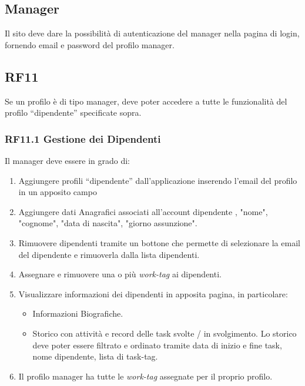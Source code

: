 \documentclass{report}
\begin{document}
\subsection{Manager}
Il sito deve dare la possibilità di autenticazione del manager nella pagina di login, fornendo email e password del profilo manager.

\subsection*{RF11}
Se un profilo è di tipo manager, deve poter accedere a tutte le funzionalità del profilo “dipendente” specificate sopra.

\subsubsection*{RF11.1 Gestione dei Dipendenti}
Il manager deve essere in grado di:

\begin{enumerate}
	
	\item Aggiungere profili “dipendente” dall’applicazione inserendo l’email del profilo in un apposito campo
	\item Aggiungere dati Anagrafici associati all'account dipendente , "nome", "cognome", "data di nascita", "giorno assunzione".
	\item Rimuovere dipendenti tramite un bottone che permette di selezionare la 
	email del dipendente e rimuoverla dalla lista dipendenti.
	
	\item Assegnare e rimuovere una o più \textit{work-tag} ai dipendenti. 
	
	\item Visualizzare informazioni dei dipendenti in apposita pagina, in particolare:
	
	\begin{itemize}
		\item Informazioni Biografiche.
		\item Storico con attività e record delle task svolte / in svolgimento. Lo storico deve poter essere filtrato e ordinato tramite data di inizio e fine task, nome dipendente, lista di task-tag.
		
	\end{itemize}
	
	\item Il profilo manager ha tutte le \textit{work-tag} assegnate per il proprio profilo.
		
\end{enumerate}
\end{document}
